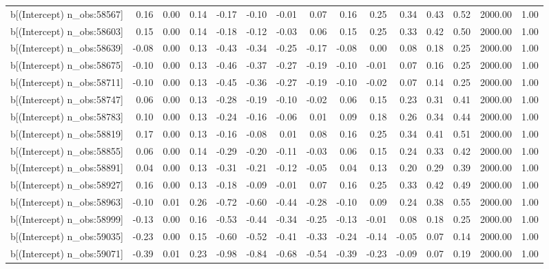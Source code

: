 \begin{table}[ht]
\begin{tabular}{rrrrrrrrrrrrrrr}
  b[(Intercept) n\_obs:58567] & 0.16 & 0.00 & 0.14 & -0.17 & -0.10 & -0.01 & 0.07 & 0.16 & 0.25 & 0.34 & 0.43 & 0.52 & 2000.00 & 1.00 \\ 
  b[(Intercept) n\_obs:58603] & 0.15 & 0.00 & 0.14 & -0.18 & -0.12 & -0.03 & 0.06 & 0.15 & 0.25 & 0.33 & 0.42 & 0.50 & 2000.00 & 1.00 \\ 
  b[(Intercept) n\_obs:58639] & -0.08 & 0.00 & 0.13 & -0.43 & -0.34 & -0.25 & -0.17 & -0.08 & 0.00 & 0.08 & 0.18 & 0.25 & 2000.00 & 1.00 \\ 
  b[(Intercept) n\_obs:58675] & -0.10 & 0.00 & 0.13 & -0.46 & -0.37 & -0.27 & -0.19 & -0.10 & -0.01 & 0.07 & 0.16 & 0.25 & 2000.00 & 1.00 \\ 
  b[(Intercept) n\_obs:58711] & -0.10 & 0.00 & 0.13 & -0.45 & -0.36 & -0.27 & -0.19 & -0.10 & -0.02 & 0.07 & 0.14 & 0.25 & 2000.00 & 1.00 \\ 
  b[(Intercept) n\_obs:58747] & 0.06 & 0.00 & 0.13 & -0.28 & -0.19 & -0.10 & -0.02 & 0.06 & 0.15 & 0.23 & 0.31 & 0.41 & 2000.00 & 1.00 \\ 
  b[(Intercept) n\_obs:58783] & 0.10 & 0.00 & 0.13 & -0.24 & -0.16 & -0.06 & 0.01 & 0.09 & 0.18 & 0.26 & 0.34 & 0.44 & 2000.00 & 1.00 \\ 
  b[(Intercept) n\_obs:58819] & 0.17 & 0.00 & 0.13 & -0.16 & -0.08 & 0.01 & 0.08 & 0.16 & 0.25 & 0.34 & 0.41 & 0.51 & 2000.00 & 1.00 \\ 
  b[(Intercept) n\_obs:58855] & 0.06 & 0.00 & 0.14 & -0.29 & -0.20 & -0.11 & -0.03 & 0.06 & 0.15 & 0.24 & 0.33 & 0.42 & 2000.00 & 1.00 \\ 
  b[(Intercept) n\_obs:58891] & 0.04 & 0.00 & 0.13 & -0.31 & -0.21 & -0.12 & -0.05 & 0.04 & 0.13 & 0.20 & 0.29 & 0.39 & 2000.00 & 1.00 \\ 
  b[(Intercept) n\_obs:58927] & 0.16 & 0.00 & 0.13 & -0.18 & -0.09 & -0.01 & 0.07 & 0.16 & 0.25 & 0.33 & 0.42 & 0.49 & 2000.00 & 1.00 \\ 
  b[(Intercept) n\_obs:58963] & -0.10 & 0.01 & 0.26 & -0.72 & -0.60 & -0.44 & -0.28 & -0.10 & 0.09 & 0.24 & 0.38 & 0.55 & 2000.00 & 1.00 \\ 
  b[(Intercept) n\_obs:58999] & -0.13 & 0.00 & 0.16 & -0.53 & -0.44 & -0.34 & -0.25 & -0.13 & -0.01 & 0.08 & 0.18 & 0.25 & 2000.00 & 1.00 \\ 
  b[(Intercept) n\_obs:59035] & -0.23 & 0.00 & 0.15 & -0.60 & -0.52 & -0.41 & -0.33 & -0.24 & -0.14 & -0.05 & 0.07 & 0.14 & 2000.00 & 1.00 \\ 
  b[(Intercept) n\_obs:59071] & -0.39 & 0.01 & 0.23 & -0.98 & -0.84 & -0.68 & -0.54 & -0.39 & -0.23 & -0.09 & 0.07 & 0.19 & 2000.00 & 1.00 \\ 

\end{tabular}
\end{table}
